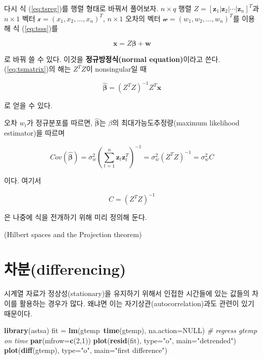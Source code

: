 \documentclass[b5paper,]{scrbook}
\makeatletter
\newenvironment{Shaded}{\begin{snugshade}}{\end{snugshade}}
\newcommand{\KeywordTok}[1]{\textcolor[rgb]{0.13,0.29,0.53}{\textbf{{#1}}}}
\newcommand{\DataTypeTok}[1]{\textcolor[rgb]{0.13,0.29,0.53}{{#1}}}
\newcommand{\DecValTok}[1]{\textcolor[rgb]{0.00,0.00,0.81}{{#1}}}
\newcommand{\StringTok}[1]{\textcolor[rgb]{0.31,0.60,0.02}{{#1}}}
\newcommand{\CommentTok}[1]{\textcolor[rgb]{0.56,0.35,0.01}{\textit{{#1}}}}
\newcommand{\OtherTok}[1]{\textcolor[rgb]{0.56,0.35,0.01}{{#1}}}
\newcommand{\NormalTok}[1]{{#1}}
\theoremstyle{plain}
\theoremstyle{definition}
\numberwithin{equation}{section}
\newenvironment{kframe}{%
\medskip{}
\setlength{\fboxsep}{.8em}
 \def\at@end@of@kframe{}%
 \ifinner\ifhmode%
  \def\at@end@of@kframe{\end{minipage}}%
  \begin{minipage}{\columnwidth}%
 \fi\fi%
 \def\FrameCommand##1{\hskip\@totalleftmargin \hskip-\fboxsep
 \colorbox{shadecolor}{##1}\hskip-\fboxsep
     \hskip-\linewidth \hskip-\@totalleftmargin \hskip\columnwidth}%
 \MakeFramed {\advance\hsize-\width
   \@totalleftmargin\z@ \linewidth\hsize
   \@setminipage}}%
 {\par\unskip\endMakeFramed%
 \at@end@of@kframe}
\renewenvironment{Shaded}{\begin{kframe}}{\end{kframe}}
\makeatother
\begin{document}
다시 식 (\eqref{eq:tsreg})를 행렬 형태로 바꿔서 풀어보자. \(n\times q\)
행렬
\(Z= [\mathbf{z}_{1} | \mathbf{z}_{2} | \cdots | \mathbf{z}_{n} ]^{T}\)과
\(n \times 1\) 벡터 \(\mathcal{x}=(x_{1},x_{2},\ldots , x_{n})^{T}\),
\(n \times 1\) 오차의 벡터
\(\mathcal{w}=(w_{1},w_{2}, \ldots, w_{n})^{T}\)를 이용해 식
(\eqref{eq:tsss})를

\begin{equation}\label{eq:tsmatrix}
\mathbf{x}=Z\boldsymbol{\beta}+\mathbf{w}
\end{equation}

로 바꿔 쓸 수 있다. 이것을 \textbf{정규방정식(normal equation)}이라고
쓴다. (\eqref{eq:tsmatrix})의 해는 \(Z^{T}Z\)이 nonsingular일 때

\[\hat{\boldsymbol{\beta}}=(Z^{T}Z)^{-1}Z^{T}\mathbf{x}\]

로 얻을 수 있다.

오차 \(w_{t}\)가 정규분포를 따르면, \(\hat{\boldsymbol{\beta}}\)는
\(\beta\)의 최대가능도추정량(maximum likelihood estimator)을 따르며

\[Cov(\hat{\boldsymbol{\beta}})=\sigma_{w}^{2}(\sum_{t=1}^{n}\mathbf{z}_{t}\mathbf{z}_{t}^{T})^{-1}=\sigma_{w}^{2}(Z^{T}Z)^{-1}=\sigma_{w}^{2}C\]

이다. 여기서

\[C=(Z^{T}Z)^{-1}\]

은 나중에 식을 전개하기 위해 미리 정의해 둔다.

(Hilbert spaces and the Projection theorem)

\section{차분(differencing)}\label{differencing}

시계열 자료가 정상성(stationary)을 유지하기 위해서 인접한 시간들에 있는
값들의 차이를 활용하는 경우가 많다. 왜냐면 이는
자기상관(autocorrelation)과도 관련이 있기 때문이다.

\begin{Shaded}
\begin{Highlighting}[]
\KeywordTok{library}\NormalTok{(astsa)}
\NormalTok{fit =}\StringTok{ }\KeywordTok{lm}\NormalTok{(gtemp~}\KeywordTok{time}\NormalTok{(gtemp), }\DataTypeTok{na.action=}\OtherTok{NULL}\NormalTok{) }\CommentTok{# regress gtemp on time}
\KeywordTok{par}\NormalTok{(}\DataTypeTok{mfrow=}\KeywordTok{c}\NormalTok{(}\DecValTok{2}\NormalTok{,}\DecValTok{1}\NormalTok{))}
\KeywordTok{plot}\NormalTok{(}\KeywordTok{resid}\NormalTok{(fit), }\DataTypeTok{type=}\StringTok{"o"}\NormalTok{, }\DataTypeTok{main=}\StringTok{"detrended"}\NormalTok{)}
\KeywordTok{plot}\NormalTok{(}\KeywordTok{diff}\NormalTok{(gtemp), }\DataTypeTok{type=}\StringTok{"o"}\NormalTok{, }\DataTypeTok{main=}\StringTok{"first difference"}\NormalTok{)}
\end{Highlighting}
\end{Shaded}
\end{document}
